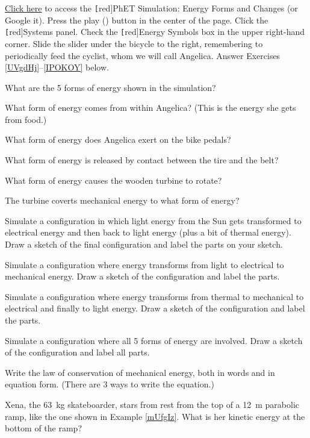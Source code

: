 \documentclass[]{exam}
\begin{document}
\begin{questions}

\question 
\href{https://phet.colorado.edu/en/simulations/energy-forms-and-changes}{Click here} to access the \texttt[red]{PhET Simulation: Energy Forms and Changes} (or Google it). Press the play ({\tiny \faPlay}) button in the center of the page. Click the \texttt[red]{Systems} panel. Check the \texttt[red]{Energy Symbols} box in the upper right-hand corner. Slide the slider under the bicycle to the right, remembering to periodically feed the cyclist, whom we will call Angelica. Answer Exercises \ref{UVgdHj}--\ref{IPOKOY} below.


\question \label{UVgdHj}
What are the 5 forms of energy shown in the simulation?


\question
What form of energy comes from within Angelica? (This is the energy she gets from food.)


\question
What form of energy does Angelica exert on the bike pedals?


\question
What form of energy is released by contact between the tire and the belt? 


\question
What form of energy causes the wooden turbine to rotate?


\question
The turbine coverts mechanical energy to what form of energy?


\question
Simulate a configuration in which light energy from the Sun gets transformed to electrical energy and then back to light energy (plus a bit of thermal energy). Draw a sketch of the final configuration and label the parts on your sketch.


\question
Simulate a configuration where energy transforms from light to electrical to mechanical energy. Draw a sketch of the configuration and label the parts.


\question
Simulate a configuration where energy transforms from thermal to mechanical to electrical and finally to light energy. Draw a sketch of the configuration and label the parts.


\question \label{IPOKOY}
Simulate a configuration where all 5 forms of energy are involved. Draw a sketch of the configuration and label all parts.

\question
Write the law of conservation of mechanical energy, both in words and in equation form. (There are 3 ways to write the equation.)


\question \label{kfZAyg}
Xena, the \SI{63}{kg} skateboarder, stars from rest from the top of a \SI{12}{m} parabolic ramp, like the one shown in Example \ref{mUfgIz}. What is her kinetic energy at the bottom of the ramp?


\end{questions}
\end{document}
